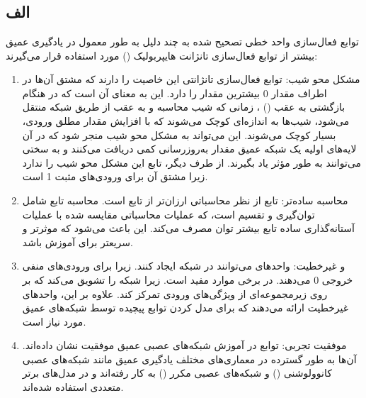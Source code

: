 \documentclass{article}
\begin{document}


\newpage


\section{}
\subsection{الف}

توابع فعال‌سازی واحد خطی تصحیح شده  به چند دلیل به طور معمول در یادگیری عمیق بیشتر از توابع فعال‌سازی تانژانت هایپربولیک () مورد استفاده قرار می‌گیرند:
\begin{enumerate}
\item مشکل محو شیب: توابع فعال‌سازی تانژانتی این خاصیت را دارند که مشتق آن‌ها در اطراف مقدار 0 بیشترین مقدار را دارد. این به معنای آن است که در هنگام بازگشتی به عقب () ، زمانی که شیب محاسبه و به عقب از طریق شبکه منتقل می‌شود، شیب‌ها به اندازه‌ای کوچک می‌شوند که با افزایش مقدار مطلق ورودی، بسیار کوچک می‌شوند. این می‌تواند به مشکل محو شیب  منجر شود که در آن لایه‌های اولیه یک شبکه عمیق مقدار به‌روزرسانی کمی دریافت می‌کنند و به سختی می‌توانند به طور مؤثر یاد بگیرند. از طرف دیگر، تابع  این مشکل محو شیب را ندارد زیرا مشتق آن برای ورودی‌های مثبت 1 است.

\item محاسبه ساده‌تر: تابع  از نظر محاسباتی ارزان‌تر از تابع  است. محاسبه تابع  شامل توان‌گیری و تقسیم است، که عملیات محاسباتی مقایسه شده با عملیات آستانه‌گذاری ساده تابع  بیشتر توان مصرف می‌کند. این باعث می‌شود که  موثرتر و سریعتر برای آموزش باشد.

\item {} و غیرخطیت: واحدهای  می‌توانند  در شبکه ایجاد کنند. زیرا برای ورودی‌های منفی خروجی 0 می‌دهند.  در برخی موارد مفید است. زیرا شبکه را تشویق می‌کند که بر روی زیرمجموعه‌ای از ویژگی‌های ورودی تمرکز کند. علاوه بر این، واحدهای  غیرخطیت ارائه می‌دهند که برای مدل کردن توابع پیچیده توسط شبکه‌های عمیق مورد نیاز است.

\item موفقیت تجربی: توابع  در آموزش شبکه‌های عصبی عمیق موفقیت نشان داده‌اند. آن‌ها به طور گسترده در معماری‌های مختلف یادگیری عمیق مانند شبکه‌های عصبی کانوولوشنی () و شبکه‌های عصبی مکرر () به کار رفته‌اند و در مدل‌های برتر متعددی استفاده شده‌اند.
\end{enumerate}
\end{document}
